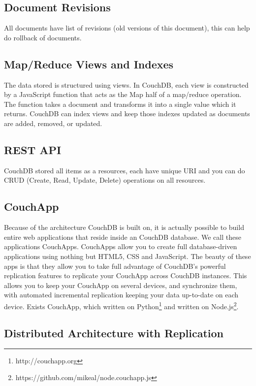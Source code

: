 \subsection{Document Revisions}

All documents have list of revisions (old versions of this document), this can help do rollback of documents.

\subsection{Map/Reduce Views and Indexes}

The data stored is structured using views. In CouchDB, each view is constructed by a JavaScript function that acts as the Map half of a map/reduce operation. The function takes a document and transforms it into a single value which it returns. CouchDB can index views and keep those indexes updated as documents are added, removed, or updated.

\subsection{REST API}

CouchDB stored all items as a resources, each have unique URI and you can do CRUD (Create, Read, Update, Delete) operations on all resources.

\subsection{CouchApp}

Because of the architecture CouchDB is built on, it is actually possible to build entire web applications that reside inside an CouchDB database. We call these applications CouchApps. CouchApps allow you to create full database-driven applications using nothing but HTML5, CSS and JavaScript. The beauty of these apps is that they allow you to take full advantage of CouchDB's powerful replication features to replicate your CouchApp across CouchDB instances. This allows you to keep your CouchApp on several devices, and synchronize them, with automated incremental replication keeping your data up-to-date on each device.\cite{ibm_couchapp} Exists CouchApp, which written on Python\footnote{http://couchapp.org} and written on Node.js\footnote{https://github.com/mikeal/node.couchapp.js}.

\subsection{Distributed Architecture with Replication}

